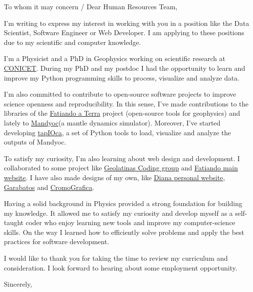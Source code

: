 \documentclass[a4paper,10pt]{letter}
\date{February 25, 2021}
\begin{document}
\begin{letter}
{To whom it may concern / Dear Human Resources Team,}
\opening{}

I'm writing to express my interest in working with you in a position like the 
Data Scientist, Software Engineer or Web Developer.
I am applying to these positions due to my scientific and computer 
knowledge. 

I'm a Physicist and a PhD in Geophysics working on scientific research at
\href{https://www.conicet.gov.ar/}{CONICET}.
During my PhD and my postdoc I had the opportunity to learn and improve my
Python programming skills to process, visualize and analyze data. 

I'm also committed to contribute to open-source software projects to improve
science openness and reproducibility.
In this sense, I've made contributions to the libraries of the
\href{https://fatiando.org}{Fatiando a Terra} project (open-source tools for
geophysics) and lately to \href{https://github.com/ggciag/mandyoc}{Mandyoc}(a 
mantle dynamics simulator).
Moreover, I've started developing 
\href{https://github.com/aguspesce/tapioca}{tapIOca}, a set of Python tools to 
load, visualize and analyze the outputs of Mandyoc.

To satisfy my curiosity, I'm also learning about web design and development.
I collaborated to some project like 
\href{https://geolatinas.github.io/}{Geolatinas Coding group} and 
\href{https://www.fatiando.org/}{Fatiando main website}. 
I have also made designs of my own, like \href{https://dianaceroallard.github.io/}{Diana 
personal website}, \href{https://aguspesce.github.io/garabatos/}{Garabatos} and 
\href{https://aguspesce.github.io/web-cromografica/}{CromoGrafica}. 

Having a solid background in Physics provided a strong foundation for building 
my knowledge.
It allowed me to satisfy my curiosity and develop myself as a self-taught coder 
who enjoy learning new tools and improve my computer-science skills.
On the way I learned how to efficiently solve problems and apply the best
practices for software development.

I would like to thank you for taking the time to review my curriculum and 
consideration. 
I look forward to hearing about some employment opportunity.


\closing{Sincerely,}


\end{letter}
\end{document}
